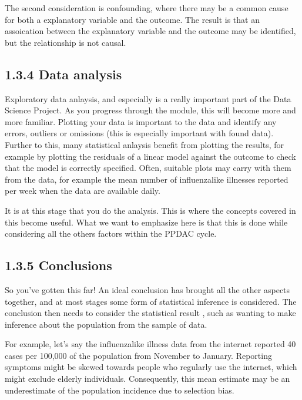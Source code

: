 \documentclass[letterpaper,10pt,english]{jupyterBook}
\begin{document}
\sphinxAtStartPar
The second consideration is confounding, where there may be a common cause for both a explanatory variable and the outcome. The result is that an assoication between the explanatory variable and the outcome may be identified, but the relationship is not causal.


\subsection{1.3.4 Data analysis}
\label{\detokenize{01. Introduction:data-analysis}}
\sphinxAtStartPar
Exploratory data anlaysis, and especially  is a really important part of the Data Science Project. As you progress through the module, this will become more and more familiar. Plotting your data is important to  the data and identify any errors, outliers or omissions (this is especially important with found data). Further to this, many statistical anlaysis benefit from plotting the results, for example by plotting the residuals of a linear model against the outcome to check that the model is correctly specified. Often, suitable plots may carry with them  from the data, for example the mean number of influenza\sphinxhyphen{}like illnesses reported per week when the data are available daily.

\sphinxAtStartPar
It is at this stage that you do the analysis. This is where the concepts covered in this  become useful. What we want to emphasize here is that this is done while considering all the others factors within the PPDAC cycle.


\subsection{1.3.5 Conclusions}
\label{\detokenize{01. Introduction:conclusions}}
\sphinxAtStartPar
So you’ve gotten this far! An ideal conclusion has brought all the other aspects together, and at most stages some form of statistical inference is considered. The conclusion then needs to consider the statistical result , such as wanting to make inference about the population from the sample of data.

\sphinxAtStartPar
For example, let’s say the influenza\sphinxhyphen{}like illness data from the internet reported 40 cases per 100,000 of the population from November to January. Reporting symptoms might be skewed towards people who regularly use the internet, which might exclude elderly individuals. Consequently, this mean estimate may be an under\sphinxhyphen{}estimate of the population incidence due to selection bias.
\end{document}
